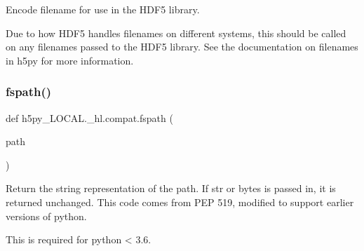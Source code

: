 \begin{DoxyVerb}Encode filename for use in the HDF5 library.

Due to how HDF5 handles filenames on different systems, this should be
called on any filenames passed to the HDF5 library. See the documentation on
filenames in h5py for more information.
\end{DoxyVerb}
 \mbox{\label{namespaceh5py__LOCAL_1_1__hl_1_1compat_a35e921f00c10f67583d2af9f1d3b575d}} 
\subsubsection{\texorpdfstring{fspath()}{fspath()}}
{\footnotesize\ttfamily def h5py\+\_\+\+L\+O\+C\+A\+L.\+\_\+hl.\+compat.\+fspath (\begin{DoxyParamCaption}\item[{}]{path }\end{DoxyParamCaption})}

\begin{DoxyVerb}Return the string representation of the path.
If str or bytes is passed in, it is returned unchanged.
This code comes from PEP 519, modified to support earlier versions of
python.

This is required for python < 3.6.
\end{DoxyVerb}
 